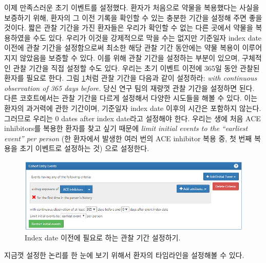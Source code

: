 \documentclass[11pt]{book}
\theoremstyle{definition}
\theoremstyle{definition}
\theoremstyle{definition}
\theoremstyle{remark}
\begin{document}
이제 만족스러운 초기 이벤트를 설정했다. 환자가 처음으로 약물을
복용했다는 사실을 보증하기 위해, 환자의 그 이전 기록을 확인할 수 있는
충분한 기간을 설정해 주면 좋을 것이다. 짧은 관찰 기간을 가진 환자들은
우리가 확인할 수 없는 다른 곳에서 약물을 복용하였을 수도 있다. 우리가
이것을 강제적으로 막을 수는 없지만 기준일자 index date 이전에 관찰
기간을 설정함으로써 최소한 해당 관찰 기간 동안에는 약물 복용이
이루어지지 않았음을 보증할 수 있다. 이를 위해 관찰 기간을 설정하는
부분이 있으며, 구체적인 관찰 기간을 직접 설정할 수도 있다. 우리는 초기
이벤트 이전에 365일 동안 관찰된 환자를 필요로 한다. 그림
\ref{fig:initialEventAce}처럼 관찰 기간을 다음과 같이 설정하라:
\emph{with continuous observation of 365 days before.} 당신 연구 팀의
재량껏 관찰 기간을 설정하면 된다. 다른 코호트에서는 관찰 기간을 다르게
설정해서 다양한 시도들을 해볼 수 있다. 이는 환자의 과거력에 관한
기간이며, 기준일자 index date 이후의 시간은 포함하지 않는다. 그러므로
우리는 0 dates after index date라고 설정해야 한다. 우리는 생에 처음 ACE
inhibitors를 복용한 환자를 찾고 싶기 때문에 \emph{limit initial events
to the ``earliest event'' per person} (한 환자에서 발생한 여러 번의 ACE
inhibitor 복용 중, 첫 번째 복용을 초기 이벤트로 설정하는 것) 으로
설정한다.

\begin{figure}

{\centering \includegraphics[width=1\linewidth]{images/Cohorts/initialEventAce} 

}

\caption{Index date 이전에 필요로 하는 관찰 기간 설정하기.}\label{fig:initialEventAce}
\end{figure}

지금껏 설정한 논리를 한 눈에 보기 위해서 환자의 타임라인을 설정해볼 수
있다.
\end{document}
